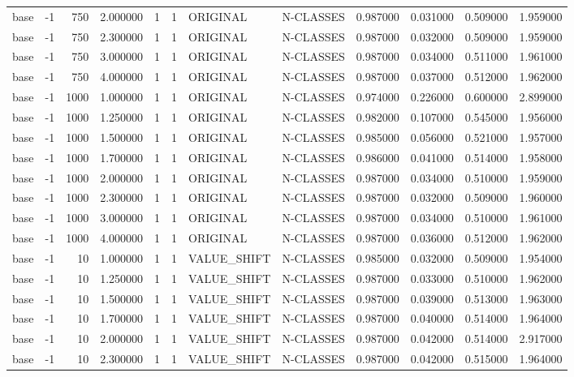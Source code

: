 \begin{tabular}{lrrrllllrrrr}
base & -1 & 750 & 2.000000 & 1 & 1 & ORIGINAL & N-CLASSES & 0.987000 & 0.031000 & 0.509000 & 1.959000 \\
base & -1 & 750 & 2.300000 & 1 & 1 & ORIGINAL & N-CLASSES & 0.987000 & 0.032000 & 0.509000 & 1.959000 \\
base & -1 & 750 & 3.000000 & 1 & 1 & ORIGINAL & N-CLASSES & 0.987000 & 0.034000 & 0.511000 & 1.961000 \\
base & -1 & 750 & 4.000000 & 1 & 1 & ORIGINAL & N-CLASSES & 0.987000 & 0.037000 & 0.512000 & 1.962000 \\
base & -1 & 1000 & 1.000000 & 1 & 1 & ORIGINAL & N-CLASSES & 0.974000 & 0.226000 & 0.600000 & 2.899000 \\
base & -1 & 1000 & 1.250000 & 1 & 1 & ORIGINAL & N-CLASSES & 0.982000 & 0.107000 & 0.545000 & 1.956000 \\
base & -1 & 1000 & 1.500000 & 1 & 1 & ORIGINAL & N-CLASSES & 0.985000 & 0.056000 & 0.521000 & 1.957000 \\
base & -1 & 1000 & 1.700000 & 1 & 1 & ORIGINAL & N-CLASSES & 0.986000 & 0.041000 & 0.514000 & 1.958000 \\
base & -1 & 1000 & 2.000000 & 1 & 1 & ORIGINAL & N-CLASSES & 0.987000 & 0.034000 & 0.510000 & 1.959000 \\
base & -1 & 1000 & 2.300000 & 1 & 1 & ORIGINAL & N-CLASSES & 0.987000 & 0.032000 & 0.509000 & 1.960000 \\
base & -1 & 1000 & 3.000000 & 1 & 1 & ORIGINAL & N-CLASSES & 0.987000 & 0.034000 & 0.510000 & 1.961000 \\
base & -1 & 1000 & 4.000000 & 1 & 1 & ORIGINAL & N-CLASSES & 0.987000 & 0.036000 & 0.512000 & 1.962000 \\
base & -1 & 10 & 1.000000 & 1 & 1 & VALUE_SHIFT & N-CLASSES & 0.985000 & 0.032000 & 0.509000 & 1.954000 \\
base & -1 & 10 & 1.250000 & 1 & 1 & VALUE_SHIFT & N-CLASSES & 0.987000 & 0.033000 & 0.510000 & 1.962000 \\
base & -1 & 10 & 1.500000 & 1 & 1 & VALUE_SHIFT & N-CLASSES & 0.987000 & 0.039000 & 0.513000 & 1.963000 \\
base & -1 & 10 & 1.700000 & 1 & 1 & VALUE_SHIFT & N-CLASSES & 0.987000 & 0.040000 & 0.514000 & 1.964000 \\
base & -1 & 10 & 2.000000 & 1 & 1 & VALUE_SHIFT & N-CLASSES & 0.987000 & 0.042000 & 0.514000 & 2.917000 \\
base & -1 & 10 & 2.300000 & 1 & 1 & VALUE_SHIFT & N-CLASSES & 0.987000 & 0.042000 & 0.515000 & 1.964000 \\

\end{tabular}
